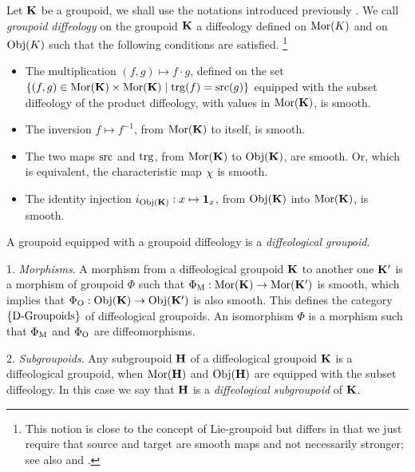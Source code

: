 \begin{article}
  \label{Diffeological-groupoids}
  Let ${\mathbf K}$ be a groupoid,
  we shall use the notations introduced previously .
  We call {\em groupoid diffeology} on the groupoid ${\mathbf K}$ a diffeology defined on  ${\operatorname{Mor}}(K)$ and on ${\operatorname{Obj}}(K)$ such that the following conditions are satisfied.%
  \footnote{This notion is close to the concept of Lie-groupoid but differs in that we just require that source and target are smooth maps and not necessarily stronger;
  see also  and .}
  \begin{itemize}
    \item[(a)] The multiplication $(f,g) \mapsto f \cdot g$,
    defined on the set $\{ (f,g) \in {\operatorname{Mor}}({\mathbf K}) \times {\operatorname{Mor}}({\mathbf K}) \mid {\operatorname{trg}}(f) = {\operatorname{src}}(g)\}$ equipped with the subset diffeology of the product diffeology,
    with values in ${\operatorname{Mor}}({\mathbf K})$,
    is smooth.
    \item[(b)]  The inversion $f \mapsto f^{-1}$,
    from ${\operatorname{Mor}}({\mathbf K})$ to itself,
    is smooth.
    \item[(c)] The two maps ${\operatorname{src}}$ and ${\operatorname{trg}}$,
    from ${\operatorname{Mor}}({\mathbf K})$ to ${\operatorname{Obj}}({\mathbf K})$, are smooth.
    Or,
    which is equivalent,
    the characteristic map $\chi$ is smooth.
    \item[(d)] The identity injection $i_{{\operatorname{Obj}}({\mathbf K})} : x \mapsto {\bf 1}_x$,
    from ${\operatorname{Obj}}({\mathbf K})$ into ${\operatorname{Mor}}({\mathbf K})$,
    is smooth.
  \end{itemize}
  A groupoid equipped with a groupoid diffeology is a {\em diffeological groupoid}.
  
  1. {\em Morphisms}.
  A morphism from a diffeological groupoid ${\mathbf K}$ to another one ${\mathbf K}'$ is a morphism of groupoid $\Phi$ such that $\Phi_{\mathrm{M}} : {\operatorname{Mor}}({\mathbf K}) \to {\operatorname{Mor}}({\mathbf K}')$ is smooth,
  which implies that $\Phi_{\mathrm{O}} : {\operatorname{Obj}}({\mathbf K}) \to {\operatorname{Obj}}({\mathbf K}')$ is also smooth.
  This defines the category $\{\operatorname{D-Groupoids}\}$ of diffeological groupoids.
  An isomorphism $\Phi$ is a morphism such that $\Phi_{\mathrm{M}}$ and $\Phi_{\mathrm{O}}$ are diffeomorphisms.
  
  2. {\em Subgroupoids}.
  Any subgroupoid ${\mathbf H}$ of a diffeological groupoid ${\mathbf K}$ is a diffeological groupoid,
  when ${\operatorname{Mor}}({\mathbf H})$ and ${\operatorname{Obj}}({\mathbf H})$ are equipped with the subset diffeology.
  In this case we say that ${\mathbf H}$ is a {\em diffeological subgroupoid} of ${\mathbf K}$.
  

\end{article}
